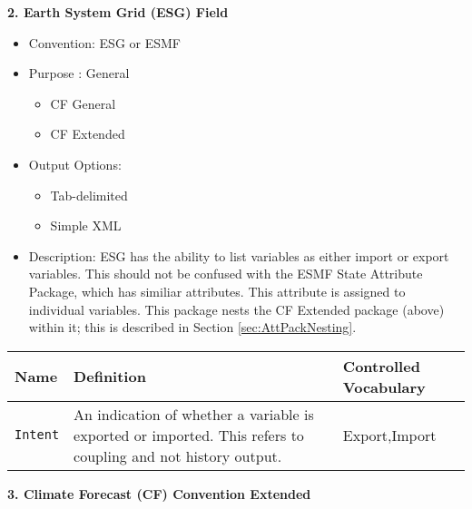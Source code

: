 \vspace{.20in}
{\bf 2. Earth System Grid (ESG) Field}

\begin{itemize}
    \item Convention: ESG or ESMF
    \item Purpose : General
\begin{itemize}
        \item CF General
        \item CF Extended
    \end{itemize}
    \item Output Options: 
    \begin{itemize}
        \item Tab-delimited
        \item Simple XML
    \end{itemize}
    \item Description: ESG has the ability to list variables as either import or export variables. This should not be confused with the ESMF State Attribute Package, which has similiar attributes. This attribute is assigned to individual variables.   This package nests the CF Extended package (above) within it; this is described in Section \ref{sec:AttPackNesting}.
\end{itemize}

\begin{tabular}{|p{5cm}|p{7cm}|p{5cm}|}
     {\bf Name } & {\bf Definition} & {\bf Controlled Vocabulary} \\
     \hline\hline
     {\tt Intent} & An indication of whether a variable is exported or imported. This refers to coupling and not history output. & Export,Import\\
\end{tabular}


\vspace{.20in}
{\bf 3. Climate Forecast (CF) Convention Extended}

